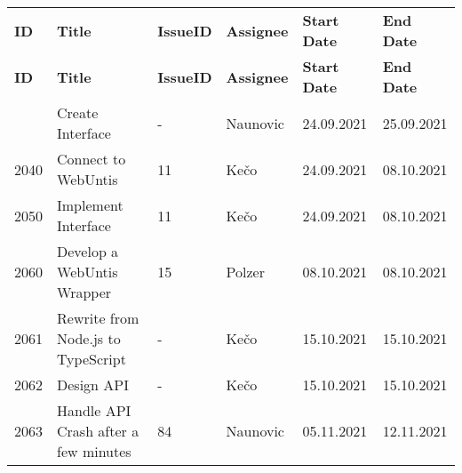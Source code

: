 \begin{longtable}{|p{}|p{}|p{}|p{}|p{}|p{}|} \hline
    \textbf{ID} & \textbf{Title} & \textbf{Issue\-ID} & \textbf{Assignee} & \textbf{Start Date} & \textbf{End\- Date} \\ \hhline{|=|=|=|=|=|=|}
    \endfirsthead
    \hline
    \textbf{ID} & \textbf{Title} & \textbf{Issue\-ID} & \textbf{Assignee} & \textbf{Start Date} & \textbf{End\- Date} \\ \hhline{|=|=|=|=|=|=|}
    \endhead
    2030 & Create Interface & - & Naunovic & 24.09.2021 & 25.09.2021 \\ \hline
    2040 & Connect to WebUntis & 11 & Kečo & 24.09.2021 & 08.10.2021 \\ \hline
    2050 & Implement Interface & 11 & Kečo & 24.09.2021 & 08.10.2021 \\ \hline
    2060 & Develop a WebUntis Wrapper & 15 & Polzer & 08.10.2021 & 08.10.2021 \\ \hline
    2061 & Rewrite from Node.js to TypeScript & - & Kečo & 15.10.2021 & 15.10.2021 \\ \hline
    2062 & Design API & - & Kečo & 15.10.2021 & 15.10.2021 \\ \hline
    2063 & Handle API Crash after a few minutes & 84 & Naunovic & 05.11.2021 & 12.11.2021 \\ \hline
\end{longtable}


